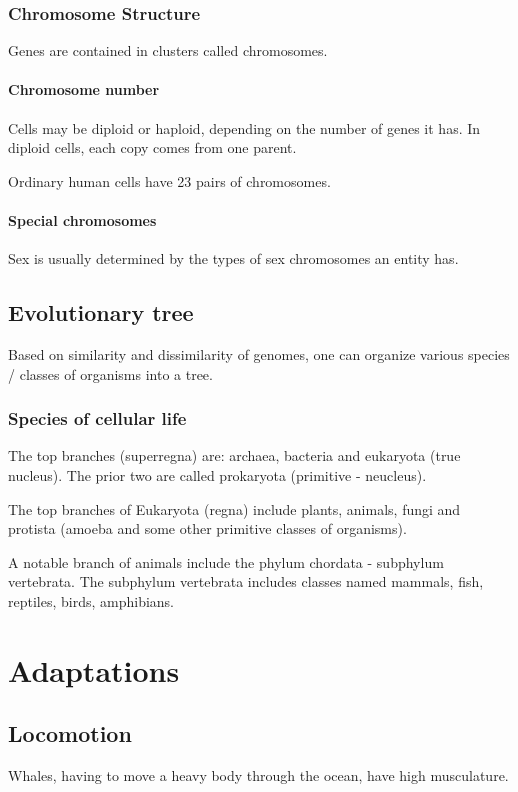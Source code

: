 \documentclass[oneside, article]{memoir}
\begin{document}
\section{Chromosome Structure}
Genes are contained in clusters called chromosomes.

\subsection{Chromosome number}
Cells may be diploid or haploid, depending on the number of genes it has. In diploid cells, each copy comes from one parent.

Ordinary human cells have 23 pairs of chromosomes. 

\subsection{Special chromosomes}
Sex is usually determined by the types of sex chromosomes an entity has.

\chapter{Evolutionary tree}
Based on similarity and dissimilarity of genomes, one can organize various species / classes of organisms into a tree.

\section{Species of cellular life}
The top branches (superregna) are: archaea, bacteria and eukaryota (true nucleus). The prior two are called prokaryota (primitive - neucleus).

The top branches of Eukaryota (regna) include plants, animals, fungi and protista (amoeba and some other primitive classes of organisms).

A notable branch of animals include the phylum chordata - subphylum vertebrata. The subphylum vertebrata includes classes named mammals, fish, reptiles, birds, amphibians.


\part{Adaptations}
\chapter{Locomotion}
Whales, having to move a heavy body through the ocean, have high musculature.
\end{document}
